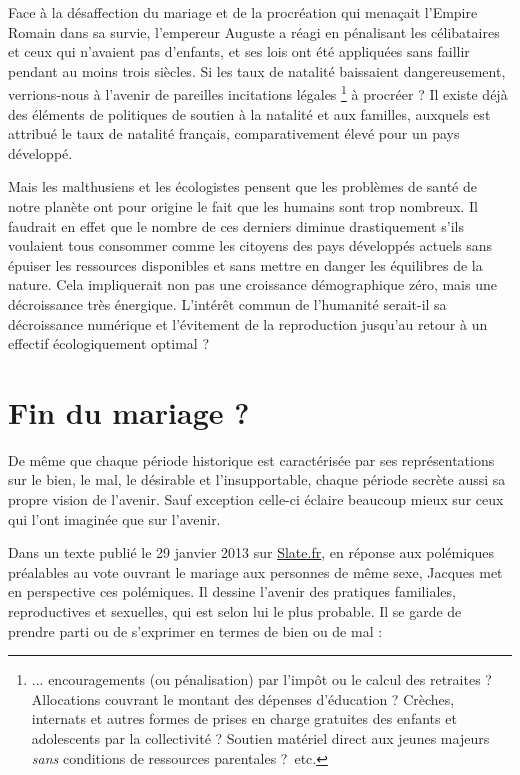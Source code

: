  Face à la désaffection du mariage et de la procréation qui menaçait l'Empire Romain dans sa survie, l'empereur Auguste a réagi en pénalisant les célibataires et ceux qui n'avaient pas d'enfants, et ses lois ont été appliquées sans faillir pendant au moins trois siècles. Si les taux de natalité baissaient dangereusement, verrions-nous à l'avenir de pareilles incitations légales%
\footnote{... encouragements (ou pénalisation) par l'impôt ou le calcul des retraites ? Allocations couvrant le montant des dépenses d'éducation ? Crèches, internats et autres formes de prises en charge gratuites des enfants et adolescents par la collectivité ? Soutien matériel direct aux jeunes majeurs \emph{sans} conditions de ressources parentales ?~etc.} 
à procréer ? Il existe déjà des éléments de politiques de soutien à la natalité et aux familles, auxquels est attribué le taux de natalité français, comparativement élevé pour un pays développé.
 
 Mais les malthusiens et les écologistes pensent que les problèmes de santé de notre planète ont pour origine le fait que les humains sont trop nombreux. Il faudrait en effet que le nombre de ces derniers diminue drastiquement s'ils voulaient tous consommer comme les citoyens des pays développés actuels sans épuiser les ressources disponibles et sans mettre en danger les équilibres de la nature. Cela impliquerait non pas une croissance démographique zéro, mais une décroissance très énergique. L'intérêt commun de l'humanité serait-il sa décroissance numérique et l'évitement de la reproduction jusqu'au retour à un effectif écologiquement optimal ? 
 
 
 \chapter{Fin du mariage ?}

 De même que chaque période historique est caractérisée par ses représentations sur le bien, le mal, le désirable et l'insupportable, chaque période secrète aussi sa propre vision de l'avenir. Sauf exception celle-ci éclaire beaucoup mieux sur ceux qui l'ont imaginée que sur l'avenir. 
 
 Dans un texte publié le 29 janvier 2013 sur \href{http://www.slate.fr}{Slate.fr}, en réponse aux polémiques préalables au vote ouvrant le mariage aux personnes de même sexe, Jacques  met en perspective ces polémiques. Il dessine l'avenir des pratiques familiales, reproductives et sexuelles, qui est selon lui le plus probable. Il se garde de prendre parti ou de s'exprimer en termes de bien ou de mal  : 

